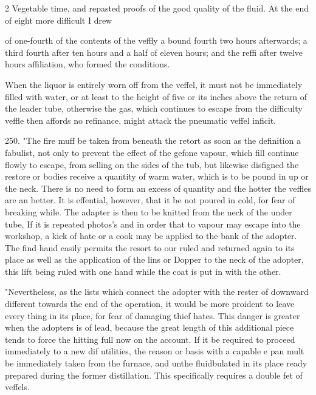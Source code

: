 \documentclass[10pt]{article}
\begin{document}
\begin{multicols}{2}\raggedcolumns
Vegetable time, and repasted proofs of the good quality of the fluid. At the end of eight more difficult I drew

of one-fourth of the contents of the veffly a bound fourth two hours afterwards; a third fourth after ten hours and a half of eleven hours; and the reffi after twelve hours affiliation, who formed the conditions.

When the liquor is entirely worn off from the veffel, it must not be immediately filled with water, or at least to the height of five or its inches above the return of the leader tube, otherwise the gas, which continues to escape from the difficulty veffle then affords no refinance, might attack the pneumatic veffel inficit.

250. "The fire muff be taken from beneath the retort as soon as the definition a fabulist, not only to prevent the effect of the gefone vapour, which fill continue flowly to escape, from selling on the sides of the tub, but likewise disfigned the restore or bodies receive a quantity of warm water, which is to be pound in up or the neck. There is no need to form an excess of quantity and the hotter the veffles are an better. It is effential, however, that it be not poured in cold, for fear of breaking while. The adapter is then to be knitted from the neck of the under tube, If it is repeated photos’s and in order that to vapour may escape into the workshop, a kick of hate or a cook may be applied to the bank of the adopter. The find hand easily permits the resort to our ruled and returned again to its place as well as the application of the lins or Dopper to the neck of the adopter, this lift being ruled with one hand while the coat is put in with the other.

"Nevertheless, as the lists which connect the adopter with the rester of downward different towards the end of the operation, it would be more proident to leave every thing in its place, for fear of damaging thief hates. This danger is greater when the adopters is of lead, because the great length of this additional piece tends to force the hitting full now on the account. If it be required to proceed immediately to a new dif utilities, the reason or basis with a capable e pan mult be immediately taken from the furnace, and unthe fluidbulated in its place ready prepared during the former distillation. This specifically requires a double fet of veffels.


\end{multicols}
\end{document}
